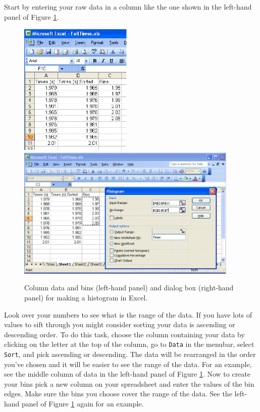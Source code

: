 Start by entering your raw data in a column like the one shown in the left-hand panel of Figure \ref{hist2}.
\begin{figure}[h!]
\begin{center}
\includegraphics[height=2.5in]{histogram_plots/histf2.eps}\hspace{0.4in}\includegraphics[height=2.5in]{histogram_plots/histf3.eps}
\caption{Column data and bins (left-hand panel) and dialog box (right-hand panel)  for making a histogram in Excel.}\label{hist2}
\end{center}
\end{figure}
Look over your numbers to see what is the range of the data.
If you have lots of values to sift through you might consider sorting your data is ascending or descending order.
To do this task, choose the column containing your data by clicking on the letter at the top of the column, 
go to {\tt Data} in the menubar, select {\tt Sort}, and pick
ascending or descending.
The data will be rearranged in the order you've chosen and it will be easier to see the range of the data.
For an example, see the middle column of data in the left-hand panel of Figure \ref{hist2}.
Now to create your bins pick a new column on your spreadsheet and enter the values of the bin edges.
Make sure the bins you choose cover the range of the data. 
See the left-hand panel of Figure \ref{hist2} again for an example.


